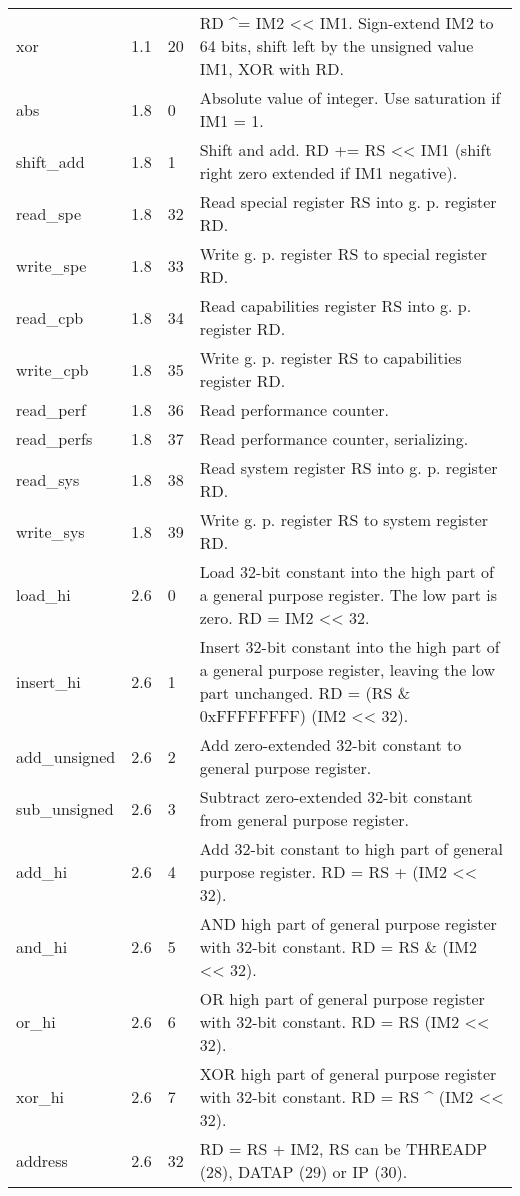 \documentclass[forwardcom.tex]{subfiles}
\begin{document}
\begin{longtable} {|p{20mm}|p{10mm}|p{8mm}|p{75mm}|}
xor           & 1.1   & 20  & RD \^{}= IM2 \textless\textless{} IM1. Sign-extend IM2 to 64 bits, shift left by the unsigned value IM1, XOR with RD. \\
abs           & 1.8   &  0  & Absolute value of integer. Use saturation if IM1 = 1. \\
shift\_add    & 1.8   &  1  & Shift and add. RD += RS \textless\textless{} IM1 (shift right zero extended if IM1 negative). \\
read\_spe     & 1.8   & 32  & Read special register RS into g. p. register RD. \\
write\_spe    & 1.8   & 33  & Write g. p. register RS to special register RD. \\
read\_cpb     & 1.8   & 34  & Read capabilities register RS into g. p. register RD. \\
write\_cpb    & 1.8   & 35  & Write g. p. register RS to capabilities register RD. \\
read\_perf    & 1.8   & 36  & Read performance counter. \\
read\_perfs   & 1.8   & 37  & Read performance counter, serializing. \\
read\_sys     & 1.8   & 38  & Read system register RS into g. p. register RD. \\
write\_sys    & 1.8   & 39  & Write g. p. register RS to system register RD. \\
load\_hi      & 2.6   &  0  & Load 32-bit constant into the high part of a general purpose register. The low part is zero. RD = IM2 \textless\textless{} 32. \\
insert\_hi    & 2.6   &  1  & Insert 32-bit constant into the high part of a general purpose register, leaving the low part unchanged.
RD = (RS \& 0xFFFFFFFF) \textbar{} (IM2 \textless\textless{} 32). \\
add\_unsigned & 2.6   &  2  & Add zero-extended 32-bit constant to general purpose register. \\
sub\_unsigned & 2.6   &  3  & Subtract zero-extended 32-bit constant from general purpose register. \\
add\_hi       & 2.6   &  4  & Add 32-bit constant to high part of general purpose register. RD = RS + (IM2 \textless\textless{} 32). \\
and\_hi       & 2.6   &  5  & AND high part of general purpose register with 32-bit constant. RD = RS \& (IM2 \textless\textless{} 32). \\
or\_hi        & 2.6   &  6  & OR high part of general purpose register with 32-bit constant. RD = RS \textbar{} (IM2 \textless\textless{} 32). \\
xor\_hi       & 2.6   &  7  & XOR high part of general purpose register with 32-bit constant. RD = RS \^{} (IM2 \textless\textless{} 32). \\
address       & 2.6   & 32  & RD = RS + IM2, RS can be THREADP (28), DATAP (29) or IP (30). \\
\hline
\end{longtable}
\end{document}
